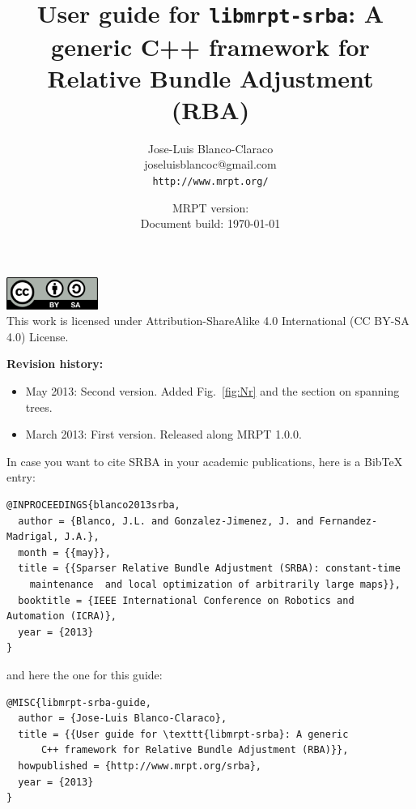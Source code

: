 \documentclass[a4paper,11pt]{article}
\title{User guide for \texttt{libmrpt-srba}: A generic C++ framework for Relative Bundle Adjustment (RBA)}
\author{Jose-Luis Blanco-Claraco \\ joseluisblancoc@gmail.com \\ \texttt{http://www.mrpt.org/} }
\date{MRPT version: \MRPTVERSION \\ Document build: \today }
\begin{document}
\maketitle


\vfill

\begin{scriptsize}
\begin{center}
\includegraphics[width=3cm]{imgs/by-sa.pdf}
\\
This work is licensed under Attribution-ShareAlike 4.0 International (CC BY-SA 4.0) License.
\end{center}
\end{scriptsize}

\vspace{1cm}

\newpage

\textbf{Revision history:}
\begin{itemize}
 \item May 2013: Second version. Added Fig.~\ref{fig:Nr} and the section on spanning trees.
 \item March 2013: First version. Released along MRPT 1.0.0.
\end{itemize}

\vfill


\begin{small}
In case you want to cite SRBA in your academic publications, here is a BibTeX entry: 

\begin{verbatim}
@INPROCEEDINGS{blanco2013srba,
  author = {Blanco, J.L. and Gonzalez-Jimenez, J. and Fernandez-Madrigal, J.A.},
  month = {{may}},
  title = {{Sparser Relative Bundle Adjustment (SRBA): constant-time 
    maintenance  and local optimization of arbitrarily large maps}},
  booktitle = {IEEE International Conference on Robotics and Automation (ICRA)},
  year = {2013}
}
\end{verbatim} 

\noindent and here the one for this guide:

\begin{verbatim}
@MISC{libmrpt-srba-guide,
  author = {Jose-Luis Blanco-Claraco},
  title = {{User guide for \texttt{libmrpt-srba}: A generic 
      C++ framework for Relative Bundle Adjustment (RBA)}},
  howpublished = {http://www.mrpt.org/srba},
  year = {2013}
} 
\end{verbatim} 

\end{small}
\end{document}
